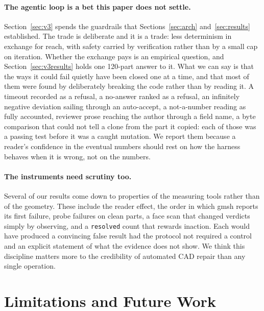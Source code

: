 \documentclass[11pt,onecolumn]{article}
\newcommand{\code}[1]{\texttt{\small #1}}
\begin{document}
\paragraph{The agentic loop is a bet this paper does not settle.}
Section~\ref{sec:v3} spends the guardrails that Sections~\ref{sec:arch}
and~\ref{sec:results} established. The trade is deliberate and it is a trade: less determinism in
exchange for reach, with safety carried by verification rather than by a small cap on iteration.
Whether the exchange pays is an empirical question, and Section~\ref{sec:v3results} holds one
120-part answer to it. What we
can say is that the ways it could fail quietly have been closed one at a time, and that most of
them were found by deliberately breaking the code rather than by reading it. A timeout recorded as
a refusal, a no-answer ranked as a refusal, an infinitely negative deviation sailing through an
auto-accept, a not-a-number reading as fully accounted, reviewer prose reaching the author through
a field name, a byte comparison that could not tell a clone from the part it copied: each of those
was a passing test before it was a caught mutation. We report them because a reader's confidence in
the eventual numbers should rest on how the harness behaves when it is wrong, not on the numbers.

\paragraph{The instruments need scrutiny too.}
Several of our results come down to properties of the measuring tools rather than of the geometry.
These include the reader effect, the order in which gmsh reports its first failure, probe failures
on clean parts, a face scan that changed verdicts simply by observing, and a \code{resolved} count
that rewards inaction. Each would have produced a convincing false result had the protocol not
required a control and an explicit statement of what the evidence does not show. We think this
discipline matters more to the credibility of automated CAD repair than any single operation.

\section{Limitations and Future Work}\label{sec:limits}
\end{document}

